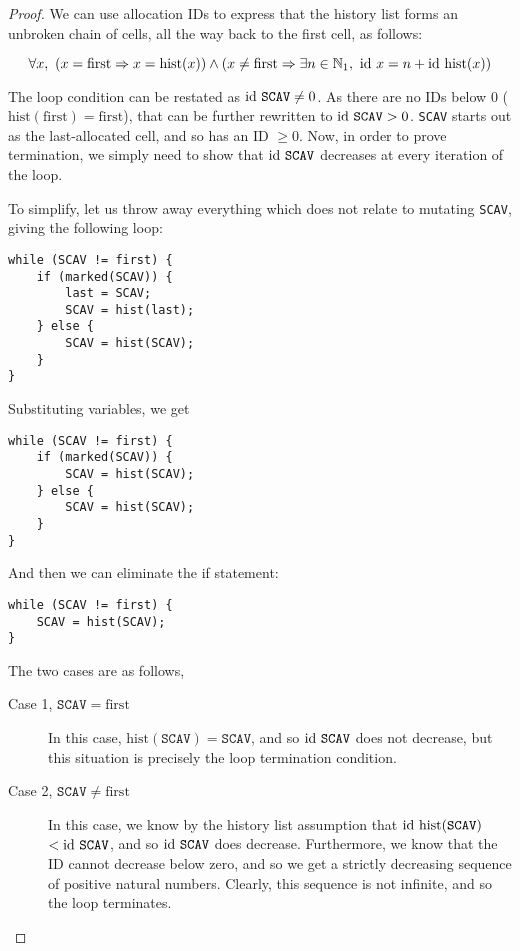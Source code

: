\begin{proof}
We can use allocation IDs to express that the history list forms an
unbroken chain of cells, all the way back to the first cell, as
follows:

\[\forall x,\ \left(x = \mathrm{first} \Rightarrow x =
  \mathrm{hist}(x)\right) \land \left(x \neq \mathrm{first} \Rightarrow
  \exists n \in \mathbb N_{1},\ \mathrm{id}~x = n +
  \mathrm{id}~\mathrm{hist}(x)\right)\]

The loop condition can be restated as $\mathrm{id}~\mathtt{SCAV} \neq 0$. As
there are no IDs below 0 ($\mathrm{hist}(\mathrm{first}) =
\mathrm{first}$), that can be further rewritten to $\mathrm{id}~\mathtt{SCAV}
> 0$. \texttt{SCAV} starts out as the last-allocated cell, and so has
an ID $\geq 0$. Now, in order to prove termination, we simply need to
show that $\mathrm{id}~\mathtt{SCAV}$ decreases at every iteration of the
loop.

To simplify, let us throw away everything which does not relate to
mutating \texttt{SCAV}, giving the following loop:

\begin{lstlisting}
while (SCAV != first) {
    if (marked(SCAV)) {
        last = SCAV;
        SCAV = hist(last);
    } else {
        SCAV = hist(SCAV);
    }
}
\end{lstlisting}

Substituting variables, we get

\begin{lstlisting}
while (SCAV != first) {
    if (marked(SCAV)) {
        SCAV = hist(SCAV);
    } else {
        SCAV = hist(SCAV);
    }
}
\end{lstlisting}

And then we can eliminate the if statement:

\begin{lstlisting}
while (SCAV != first) {
    SCAV = hist(SCAV);
}
\end{lstlisting}

The two cases are as follows,

\begin{description}
  \item[Case 1, $\mathtt{SCAV} = \mathrm{first}$] In this case,
    $\mathrm{hist}(\mathtt{SCAV}) = \mathtt{SCAV}$, and so
    $\mathrm{id}~\mathtt{SCAV}$ does not decrease, but this situation is
    precisely the loop termination condition.

  \item[Case 2, $\mathtt{SCAV} \neq \mathrm{first}$] In this case, we
    know by the history list assumption that
    $\mathrm{id}~\mathrm{hist}(\mathtt{SCAV})$ $<\mathrm{id}~\mathtt{SCAV}$, and so
    $\mathrm{id}~\mathtt{SCAV}$ does decrease. Furthermore, we know that the
    ID cannot decrease below zero, and so we get a strictly decreasing
    sequence of positive natural numbers. Clearly, this sequence is
    not infinite, and so the loop terminates.
\end{description}
\end{proof}

